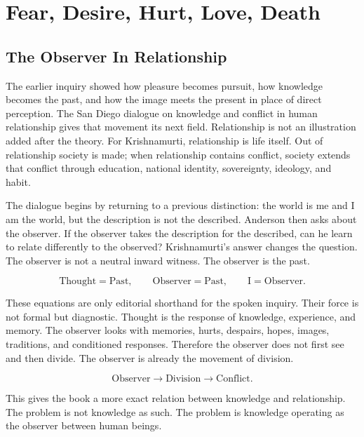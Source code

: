 \documentclass[11pt,oneside]{book}
\begin{document}
\part{Fear, Desire, Hurt, Love, Death}

\chapter{The Observer In Relationship}

The earlier inquiry showed how pleasure becomes pursuit, how knowledge becomes the past, and how the image meets the present in place of direct perception. The San Diego dialogue on knowledge and conflict in human relationship gives that movement its next field. Relationship is not an illustration added after the theory. For Krishnamurti, relationship is life itself. Out of relationship society is made; when relationship contains conflict, society extends that conflict through education, national identity, sovereignty, ideology, and habit.

The dialogue begins by returning to a previous distinction: the world is me and I am the world, but the description is not the described. Anderson then asks about the observer. If the observer takes the description for the described, can he learn to relate differently to the observed? Krishnamurti's answer changes the question. The observer is not a neutral inward witness. The observer is the past.

\begin{equation}
\mathrm{Thought}=\mathrm{Past},
\qquad
\mathrm{Observer}=\mathrm{Past},
\qquad
\mathrm{I}=\mathrm{Observer}.
\end{equation}

These equations are only editorial shorthand for the spoken inquiry. Their force is not formal but diagnostic. Thought is the response of knowledge, experience, and memory. The observer looks with memories, hurts, despairs, hopes, images, traditions, and conditioned responses. Therefore the observer does not first see and then divide. The observer is already the movement of division.

\begin{equation}
\mathrm{Observer}
\longrightarrow
\mathrm{Division}
\longrightarrow
\mathrm{Conflict}.
\end{equation}

This gives the book a more exact relation between knowledge and relationship. The problem is not knowledge as such. The problem is knowledge operating as the observer between human beings.
\end{document}

